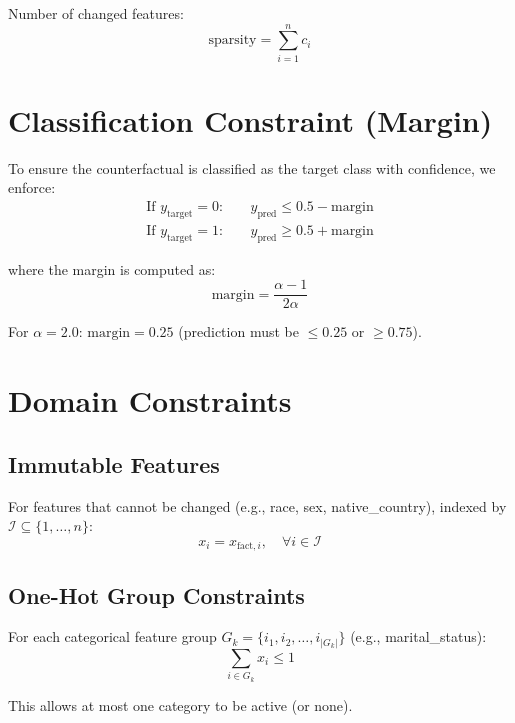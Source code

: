 \documentclass{article}
\begin{document}
Number of changed features:
\begin{equation}
\text{sparsity} = \sum_{i=1}^{n} c_i
\end{equation}

\section{Classification Constraint (Margin)}

To ensure the counterfactual is classified as the target class with confidence, we enforce:
\begin{align}
\text{If } y_{\text{target}} = 0: \quad &y_{\text{pred}} \leq 0.5 - \text{margin} \\
\text{If } y_{\text{target}} = 1: \quad &y_{\text{pred}} \geq 0.5 + \text{margin}
\end{align}

where the margin is computed as:
\begin{equation}
\text{margin} = \frac{\alpha - 1}{2\alpha}
\end{equation}

For $\alpha = 2.0$: $\text{margin} = 0.25$ (prediction must be $\leq 0.25$ or $\geq 0.75$).

\section{Domain Constraints}

\subsection{Immutable Features}

For features that cannot be changed (e.g., race, sex, native\_country), indexed by $\mathcal{I} \subseteq \{1, \ldots, n\}$:
\begin{equation}
x_i = x_{\text{fact},i}, \quad \forall i \in \mathcal{I}
\end{equation}

\subsection{One-Hot Group Constraints}

For each categorical feature group $G_k = \{i_1, i_2, \ldots, i_{|G_k|}\}$ (e.g., marital\_status):
\begin{equation}
\sum_{i \in G_k} x_i \leq 1
\end{equation}

This allows at most one category to be active (or none).
\end{document}
